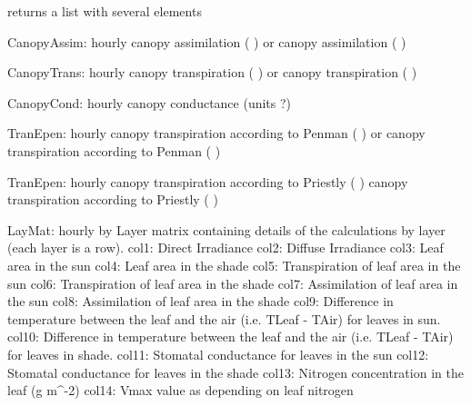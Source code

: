\documentclass[letterpaper]{book}
\begin{document}
\begin{Value}

returns a list with several elements

CanopyAssim: hourly canopy assimilation ( ) or canopy
assimilation ( )

CanopyTrans: hourly canopy transpiration ( ) or canopy
transpiration ( )

CanopyCond: hourly canopy conductance (units ?)

TranEpen: hourly canopy transpiration according to Penman
( ) or canopy
transpiration according to Penman (
)

TranEpen: hourly canopy transpiration according to Priestly
( ) canopy
transpiration according to Priestly ( )

LayMat: hourly by Layer matrix containing details of the
calculations by layer (each layer is a row).  col1: Direct
Irradiance col2: Diffuse Irradiance col3: Leaf area in the
sun col4: Leaf area in the shade col5: Transpiration of
leaf area in the sun col6: Transpiration of leaf area in
the shade col7: Assimilation of leaf area in the sun col8:
Assimilation of leaf area in the shade col9: Difference in
temperature between the leaf and the air (i.e. TLeaf -
TAir) for leaves in sun.  col10: Difference in temperature
between the leaf and the air (i.e. TLeaf - TAir) for leaves
in shade.  col11: Stomatal conductance for leaves in the
sun col12: Stomatal conductance for leaves in the shade
col13: Nitrogen concentration in the leaf (g m\textasciicircum{}-2) col14:
Vmax value as depending on leaf nitrogen
\end{Value}
%
\begin{Examples}
\end{Examples}
\end{document}
